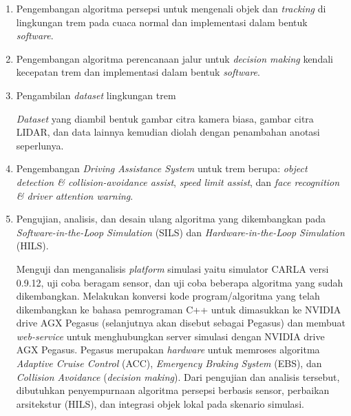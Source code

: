 \begin{enumerate}

    \item Pengembangan algoritma persepsi untuk mengenali objek dan
    \textit{tracking} di lingkungan trem pada cuaca normal dan implementasi
    dalam bentuk \textit{software}.


    \item Pengembangan algoritma perencanaan jalur untuk \textit{decision
    making} kendali kecepatan trem dan implementasi dalam bentuk
    \textit{software}.


    \item Pengambilan \textit{dataset} lingkungan trem

    \textit{Dataset} yang diambil bentuk gambar citra kamera biasa, gambar citra
    LIDAR, dan data lainnya kemudian diolah dengan penambahan anotasi
    seperlunya.

    \item Pengembangan \textit{Driving Assistance System} untuk trem berupa:
    \textit{object detection \& collision-avoidance assist}, \textit{speed limit
    assist}, dan \textit{face recognition \& driver attention warning}.

    \item Pengujian, analisis, dan desain ulang algoritma yang dikembangkan pada
    \textit{Software-in-the-Loop Simulation} (SILS) dan
    \textit{Hardware-in-the-Loop Simulation} (HILS).

    Menguji dan menganalisis \textit{platform} simulasi yaitu simulator CARLA
    versi 0.9.12, uji coba beragam sensor, dan uji coba beberapa algoritma yang
    sudah dikembangkan. Melakukan konversi kode program/algoritma yang telah
    dikembangkan ke bahasa pemrograman C++ untuk dimasukkan ke NVIDIA drive AGX
    Pegasus (selanjutnya akan disebut sebagai Pegasus) dan membuat
    \textit{web-service} untuk menghubungkan server simulasi dengan NVIDIA drive
    AGX Pegasus. Pegasus merupakan \textit{hardware} untuk memroses
    algoritma \textit{Adaptive Cruise Control} (ACC), \textit{Emergency Braking
    System} (EBS), dan \textit{Collision Avoidance} (\textit{decision making}).
    Dari pengujian dan analisis tersebut, dibutuhkan penyempurnaan algoritma
    persepsi berbasis sensor, perbaikan arsitekstur (HILS), dan integrasi objek
    lokal pada skenario simulasi.


\end{enumerate}
